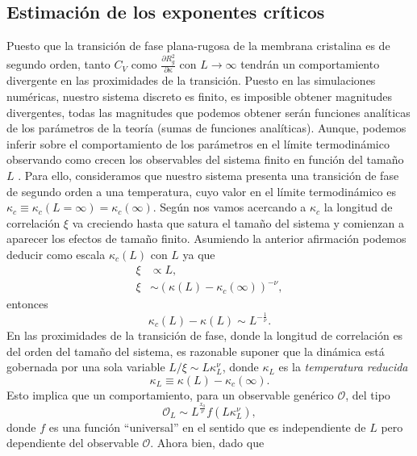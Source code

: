 \subsection{Estimación de los exponentes críticos}

Puesto que la transición de fase plana-rugosa de la membrana cristalina es de
segundo orden, tanto $C_V$ como $\frac{\partial R_g^2}{\partial \kappa}$  con
$L\rightarrow \infty$ tendrán un comportamiento divergente en las proximidades
de la transición. Puesto en las simulaciones numéricas, nuestro sistema
discreto es finito, es imposible obtener magnitudes divergentes, todas las
magnitudes que podemos obtener serán funciones analíticas de los parámetros de
la teoría (sumas de funciones analíticas). Aunque, podemos inferir sobre el
comportamiento de los parámetros en el límite termodinámico observando como
crecen los observables del sistema finito en función del tamaño $L$ \cite{Juan:tesis}. 
Para ello, consideramos que nuestro sistema presenta una transición de fase de
segundo orden a una temperatura, cuyo valor en el límite termodinámico es
$\kappa_c\!\equiv\!\kappa_c{\scriptstyle
  (L=\infty)}\!=\!\kappa_c(\infty)$. Según nos vamos acercando a $\kappa_c$ la
longitud de correlación $\xi$ va creciendo hasta que satura el tamaño del
sistema y comienzan a aparecer los efectos de tamaño finito. Asumiendo la
anterior afirmación podemos deducir como escala $\kappa_c(L)$ con $L$ ya que
\begin{align*}
\xi&\propto L,\\ 
\xi&\sim (\kappa(L)-\kappa_c(\infty))^{-\nu},
\end{align*}
entonces
\begin{equation*}
\kappa_c(L)-\kappa(L)\sim L^{-\frac{1}{\nu}}.
\end{equation*}
En las proximidades de la transición de fase, donde la longitud de correlación
es del orden del tamaño del sistema, es razonable suponer que la dinámica está
gobernada por una sola variable $L/\xi\sim L \kappa_L^{\nu}$, donde $\kappa_L$
es la \textit{temperatura reducida}
\begin{equation*}
\kappa_L\equiv \kappa(L)-\kappa_c(\infty).
\end{equation*}
Esto implica que un comportamiento, para un observable genérico $\mathcal{O}$, del tipo
\begin{equation*}
\mathcal{O}_L\sim L^{\frac{x_0}{\nu}}f(L \kappa_L^{\nu}),
\end{equation*}
donde $f$ es una función ``universal'' en el sentido que es independiente de
$L$ pero dependiente del observable $\mathcal{O}$. Ahora bien, dado que
